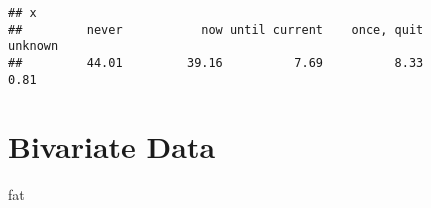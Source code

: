 \documentclass[
]{book}
\newenvironment{Shaded}{\begin{snugshade}}{\end{snugshade}}
\newcommand{\NormalTok}[1]{#1}
\theoremstyle{definition}
\theoremstyle{definition}
\theoremstyle{definition}
\theoremstyle{definition}
\theoremstyle{remark}
\begin{document}
\begin{verbatim}
## x
##         never           now until current    once, quit       unknown 
##         44.01         39.16          7.69          8.33          0.81
\end{verbatim}

\hypertarget{bivariate-data}{%
\chapter{Bivariate Data}\label{bivariate-data}}

\begin{Shaded}
\begin{Highlighting}[]
\NormalTok{fat}
\end{Highlighting}
\end{Shaded}
\end{document}
